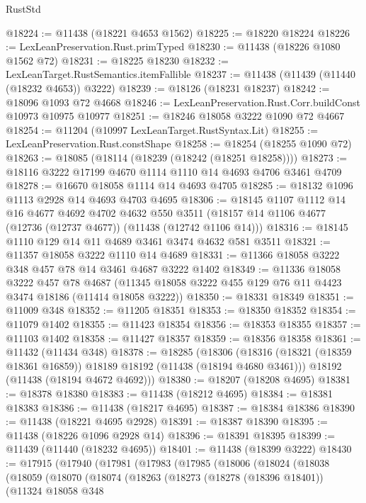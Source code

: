 \begin{lexlean}{RustStd}
\begin{coremodule}
@18224 := @11438 (@18221 @4653 @1562)
@18225 := @18220 @18224
@18226 := LexLeanPreservation.Rust.primTyped
@18230 := @11438 (@18226 @1080 @1562 @72)
@18231 := @18225 @18230
@18232 := LexLeanTarget.RustSemantics.itemFallible
@18237 := @11438 (@11439 (@11440 (@18232 @4653)) @3222)
@18239 := @18126 (@18231 @18237)
@18242 := @18096 @1093 @72 @4668
@18246 := LexLeanPreservation.Rust.Corr.buildConst @10973 @10975 @10977
@18251 := @18246 @18058 @3222 @1090 @72 @4667
@18254 := @11204 (@10997 LexLeanTarget.RustSyntax.Lit)
@18255 := LexLeanPreservation.Rust.constShape
@18258 := @18254 (@18255 @1090 @72)
@18263 := @18085 (@18114 (@18239 (@18242 (@18251 @18258))))
@18273 := @18116 @3222 @17199 @4670 @1114 @1110 @14 @4693 @4706 @3461 @4709
@18278 := @16670 @18058 @1114 @14 @4693 @4705
@18285 := @18132 @1096 @1113 @2928 @14 @4693 @4703 @4695
@18306 := @18145
    @1107
    @1112
    @14
    @16
    @4677
    @4692
    @4702
    @4632
    @550
    @3511
    (@18157 @14 @1106 @4677 (@12736 (@12737 @4677)) (@11438 (@12742 @1106 @14)))
@18316 := @18145 @1110 @129 @14 @11 @4689 @3461 @3474 @4632 @581 @3511
@18321 := @11357 @18058 @3222 @1110 @14 @4689
@18331 := @11366 @18058 @3222 @348 @457 @78 @14 @3461 @4687 @3222 @1402
@18349 := @11336
    @18058
    @3222
    @457
    @78
    @4687
    (@11345 @18058 @3222 @455 @129 @76 @11 @4423 @3474 @18186 (@11414 @18058 @3222))
@18350 := @18331 @18349
@18351 := @11009 @348
@18352 := @11205 @18351
@18353 := @18350 @18352
@18354 := @11079 @1402
@18355 := @11423 @18354
@18356 := @18353 @18355
@18357 := @11103 @1402
@18358 := @11427 @18357
@18359 := @18356 @18358
@18361 := @11432 (@11434 @348)
@18378 := @18285
    (@18306
      (@18316 (@18321 (@18359 @18361 @16859)) @18189 @18192 (@11438 (@18194 @4680 @3461)))
      @18192
      (@11438 (@18194 @4672 @4692)))
@18380 := @18207 (@18208 @4695)
@18381 := @18378 @18380
@18383 := @11438 (@18212 @4695)
@18384 := @18381 @18383
@18386 := @11438 (@18217 @4695)
@18387 := @18384 @18386
@18390 := @11438 (@18221 @4695 @2928)
@18391 := @18387 @18390
@18395 := @11438 (@18226 @1096 @2928 @14)
@18396 := @18391 @18395
@18399 := @11439 (@11440 (@18232 @4695))
@18401 := @11438 (@18399 @3222)
@18430 := @17915
    (@17940
      (@17981
        (@17983
          (@17985
            (@18006
              (@18024
                (@18038
                  (@18059
                    (@18070
                      (@18074
                        (@18263
                          (@18273
                            (@18278 (@18396 @18401))
                            (@11324
                              @18058
                              @348

\end{coremodule}
\end{lexlean}
